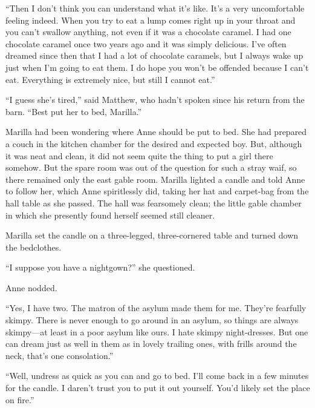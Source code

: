 \documentclass[a4paper]{article}
\begin{document}
\ttfamily``Then I don't think you can understand what it's like. It's a very uncomfortable feeling indeed. When you try to eat a lump comes right up in your throat and you can't swallow anything, not even if it was a chocolate caramel. \textsf{I had one chocolate caramel once two years ago and it was simply delicious. I've often dreamed since then that I had a lot of chocolate caramels, but I always wake up just when I'm going to eat them.} I do hope you won't be offended because I can't eat. Everything is extremely nice, but still I cannot eat.''

``I guess she's tired,'' said Matthew, who hadn't spoken since his return from the barn. ``Best put her to bed, Marilla.''

\textsf{Marilla had been wondering where Anne should be put to bed. She had prepared a couch in the kitchen chamber for the desired and expected boy. But, although it was neat and clean, it did not seem quite the thing to put a girl there somehow. But the spare room was out of the question for such a stray waif, so there remained only the east gable room. Marilla lighted a candle and told Anne to follow her, which Anne spiritlessly did, taking her hat and carpet-bag from the hall table as she passed. The hall was fearsomely clean; the little gable chamber in which she presently found herself seemed still cleaner.}

Marilla set the candle on a three-legged, three-cornered table and turned down the bedclothes.

``I suppose you \textrm{have a nightgown?''} she questioned.

Anne nodded.

\textrm{``Yes, I have two. The matron of the asylum made them for me. They're fearfully skimpy. There is never enough to go around in an asylum, so things are always skimpy---at least in a poor asylum like ours. I hate skimpy night-dresses. But one can dream just as well in them as in lovely trailing ones, with frills around the neck, that's one consolation.''}

``Well, undress as quick as you can and go to bed. I'll come back in a few minutes for the candle. I daren't trust you to put it out yourself. You'd likely set the place on fire.''
\end{document}
